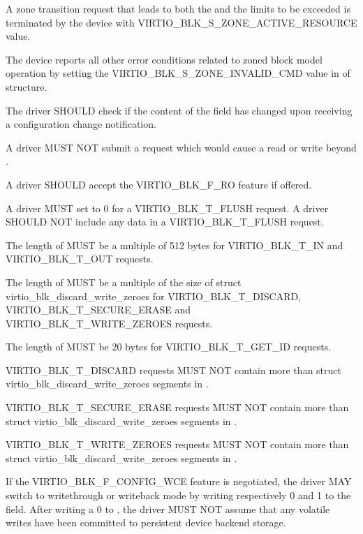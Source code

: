 A zone transition request that leads to both the  and the
 limits to be exceeded is terminated by the device with
VIRTIO_BLK_S_ZONE_ACTIVE_RESOURCE  value.

The device reports all other error conditions related to zoned block model
operation by setting the VIRTIO_BLK_S_ZONE_INVALID_CMD value in
 of  structure.


The driver SHOULD check if the content of the  field has
changed upon receiving a configuration change notification.

A driver MUST NOT submit a request which would cause a read or write
beyond .

A driver SHOULD accept the VIRTIO_BLK_F_RO feature if offered.

A driver MUST set  to 0 for a VIRTIO_BLK_T_FLUSH request.
A driver SHOULD NOT include any data in a VIRTIO_BLK_T_FLUSH request.

The length of  MUST be a multiple of 512 bytes for VIRTIO_BLK_T_IN
and VIRTIO_BLK_T_OUT requests.

The length of  MUST be a multiple of the size of struct
virtio_blk_discard_write_zeroes for VIRTIO_BLK_T_DISCARD,
VIRTIO_BLK_T_SECURE_ERASE and VIRTIO_BLK_T_WRITE_ZEROES requests.

The length of  MUST be 20 bytes for VIRTIO_BLK_T_GET_ID requests.

VIRTIO_BLK_T_DISCARD requests MUST NOT contain more than
 struct virtio_blk_discard_write_zeroes segments in
.

VIRTIO_BLK_T_SECURE_ERASE requests MUST NOT contain more than
 struct virtio_blk_discard_write_zeroes segments in
.

VIRTIO_BLK_T_WRITE_ZEROES requests MUST NOT contain more than
 struct virtio_blk_discard_write_zeroes segments in
.

If the VIRTIO_BLK_F_CONFIG_WCE feature is negotiated, the driver MAY
switch to writethrough or writeback mode by writing respectively 0 and
1 to the  field.  After writing a 0 to ,
the driver MUST NOT assume that any volatile writes have been committed
to persistent device backend storage.

